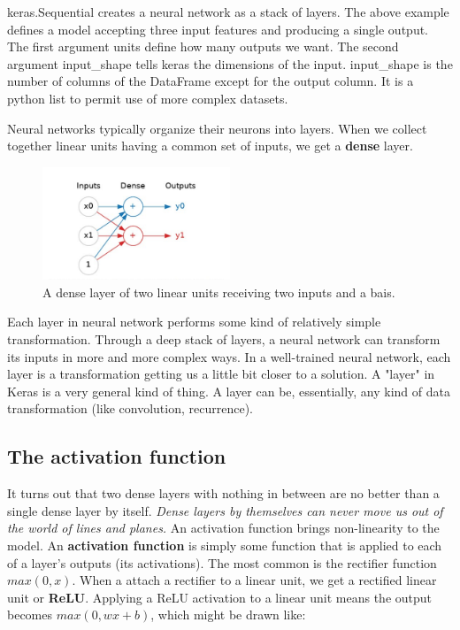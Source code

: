 \noindent keras.Sequential creates a neural network as a stack
of layers. The above example defines a model accepting three input
features and producing a single output. The first argument units
define how many outputs we want. The second argument input\_shape
tells keras the dimensions of the input. input\_shape is the number
of columns of the DataFrame except for the output column. It is a
python list to permit use of more complex datasets.

\noindent Neural networks typically organize their neurons into layers.
When we collect together linear units having a common set of inputs, we
get a \textbf{dense} layer.

\begin{figure}[htp]
	\centering
	\includegraphics[width=0.5\textwidth]{../assets/machine_learning_random/denser_layer_with_two_inputs_and_a_bias.jpg}
	\caption{A dense layer of two linear units receiving two inputs and a bais.}
\end{figure}

\noindent Each layer in neural network performs some kind of relatively
simple transformation. Through a deep stack of layers, a neural network can
transform its inputs in more and more complex ways. In a well-trained
neural network, each layer is a transformation getting us a little bit
closer to a solution. A "layer" in Keras is a very general kind of thing.
A layer can be, essentially, any kind of data transformation (like
convolution, recurrence). 

\subsection{The activation function}
\noindent It turns out that two dense layers with nothing in between
are no better than a single dense layer by itself. \emph{Dense layers by
themselves can never move us out of the world of lines and planes.}
An activation function brings non-linearity to the model. An 
\textbf{activation function} is simply some function that is applied to
each of a layer's outputs (its activations). The most common is the
rectifier function $ max(0,x) $. When a attach a rectifier to a linear
unit, we get a rectified linear unit or \textbf{ReLU}. Applying a ReLU
activation to a linear unit means the output becomes $ max(0, wx + b) $,
which might be drawn like:

